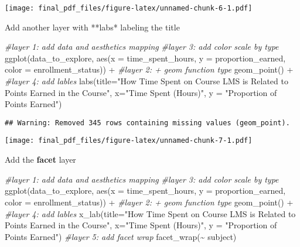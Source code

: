 \documentclass[
]{article}
\newenvironment{Shaded}{\begin{snugshade}}{\end{snugshade}}
\newcommand{\AttributeTok}[1]{\textcolor[rgb]{0.77,0.63,0.00}{#1}}
\newcommand{\CommentTok}[1]{\textcolor[rgb]{0.56,0.35,0.01}{\textit{#1}}}
\newcommand{\FunctionTok}[1]{\textcolor[rgb]{0.00,0.00,0.00}{#1}}
\newcommand{\NormalTok}[1]{#1}
\newcommand{\SpecialCharTok}[1]{\textcolor[rgb]{0.00,0.00,0.00}{#1}}
\newcommand{\StringTok}[1]{\textcolor[rgb]{0.31,0.60,0.02}{#1}}
\begin{document}
\texttt{[image: final\_pdf\_files/figure-latex/unnamed-chunk-6-1.pdf]}

Add another layer with **labs* labeling the title

\begin{Shaded}
\begin{Highlighting}[]
\CommentTok{\#layer 1: add data and aesthetics mapping }
\CommentTok{\#layer 3: add color scale by type}
\FunctionTok{ggplot}\NormalTok{(data\_to\_explore, }
       \FunctionTok{aes}\NormalTok{(}\AttributeTok{x =}\NormalTok{ time\_spent\_hours, }
           \AttributeTok{y =}\NormalTok{ proportion\_earned,}
           \AttributeTok{color =}\NormalTok{ enrollment\_status)) }\SpecialCharTok{+}
\CommentTok{\#layer 2: +  geom function type}
  \FunctionTok{geom\_point}\NormalTok{() }\SpecialCharTok{+}
\CommentTok{\#layer 4: add lables}
  \FunctionTok{labs}\NormalTok{(}\AttributeTok{title=}\StringTok{"How Time Spent on Course LMS is Related to Points Earned in the Course"}\NormalTok{, }\AttributeTok{x=}\StringTok{"Time Spent (Hours)"}\NormalTok{, }\AttributeTok{y =} \StringTok{"Proportion of Points Earned"}\NormalTok{)}
\end{Highlighting}
\end{Shaded}

\begin{verbatim}
## Warning: Removed 345 rows containing missing values (geom_point).
\end{verbatim}

\texttt{[image: final\_pdf\_files/figure-latex/unnamed-chunk-7-1.pdf]}

Add the \textbf{facet} layer

\begin{Shaded}
\begin{Highlighting}[]
\CommentTok{\#layer 1: add data and aesthetics mapping }
\CommentTok{\#layer 3: add color scale by type}
\FunctionTok{ggplot}\NormalTok{(data\_to\_explore, }\FunctionTok{aes}\NormalTok{(}\AttributeTok{x =}\NormalTok{ time\_spent\_hours, }\AttributeTok{y =}\NormalTok{ proportion\_earned, }\AttributeTok{color =}\NormalTok{ enrollment\_status)) }\SpecialCharTok{+}
\CommentTok{\#layer 2: +  geom function type}
  \FunctionTok{geom\_point}\NormalTok{() }\SpecialCharTok{+}
\CommentTok{\#layer 4: add lables}
    \FunctionTok{x\_lab}\NormalTok{(}\AttributeTok{title=}\StringTok{"How Time Spent on Course LMS is Related to Points Earned in the Course"}\NormalTok{, }
       \AttributeTok{x=}\StringTok{"Time Spent (Hours)"}\NormalTok{,}
       \AttributeTok{y =} \StringTok{"Proportion of Points Earned"}\NormalTok{)}
\CommentTok{\#layer 5: add facet wrap}
  \FunctionTok{facet\_wrap}\NormalTok{(}\SpecialCharTok{\textasciitilde{}}\NormalTok{ subject) }
\end{Highlighting}
\end{Shaded}
\end{document}
